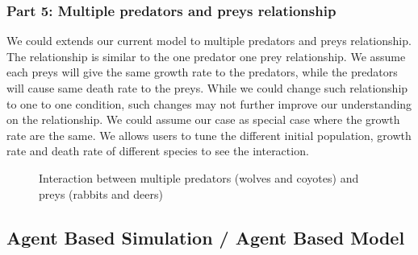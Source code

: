\documentclass{article}
\begin{document}
\begin{normalsize}
	\subsubsection{Part 5: Multiple predators and preys relationship}
	We could extends our current model to multiple predators and preys relationship. The relationship is similar to the one predator one prey relationship. We assume each preys will give the same growth rate to the predators, while the predators will cause same death rate to the preys. While we could change such relationship to one to one condition, such changes may not further improve our understanding on the relationship. We could assume our case as special case where the growth rate are the same.
		We allows users to tune the different initial population, growth rate and death rate of different species to see the interaction. 
	\begin{figure}[H]
		\caption{Interaction between multiple predators (wolves and coyotes) and preys (rabbits and deers)}
	\end{figure}

\newpage
\subsection{Agent Based Simulation / Agent Based Model}

\end{normalsize}
\end{document}
